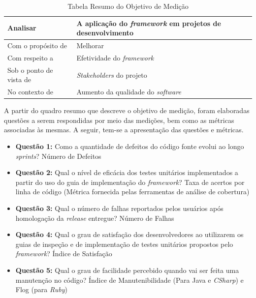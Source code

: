 \begin{table}[h]
\centering
\begin{tabular}{ | m{8cm} | m{8cm} | } 
\hline
Analisar & A aplicação do \textit{framework} em projetos de desenvolvimento \\ 
\hline
Com o propósito de & Melhorar \\ 
\hline
Com respeito a & Efetividade do \textit{framework} \\ 
\hline
Sob o ponto de vista de & \textit{Stakeholders} do projeto \\ 
\hline
No contexto de & Aumento da qualidade do \textit{software} \\ 
\hline
\end{tabular}
\caption{Tabela Resumo do Objetivo de Medição}
\label{table:tabela1}
\end{table}

A partir do quadro resumo que descreve o objetivo de medição, foram elaboradas questões a serem respondidas por meio das medições, bem como as métricas associadas às mesmas. A seguir, tem-se a apresentação das questões e métricas.

\begin{itemize}
	\item \textbf{Questão 1:} Como a quantidade de defeitos do código fonte evolui ao longo \textit{sprints}?
	\subitem Número de Defeitos

	\item \textbf{Questão 2:} Qual o nível de eficácia dos testes unitários implementados a partir do uso do guia de implementação do \textit{framework}?
	\subitem Taxa de acertos por linha de código (Métrica fornecida pelas ferramentas de análise de cobertura)

	\item \textbf{Questão 3:} Qual o número de falhas reportados pelos usuários após homologação da \textit{release} entregue?
	\subitem Número de Falhas

	\item \textbf{Questão 4:} Qual o grau de satisfação dos desenvolvedores ao utilizarem os guias de inspeção e de implementação de testes unitários propostos pelo \textit{framework}?
	\subitem Índice de Satisfação

	\item \textbf{Questão 5:} Qual o grau de facilidade percebido quando vai ser feita uma manutenção no código?
	\subitem Índice de Manutenibilidade (Para Java e \textit{CSharp}) e Flog (para \textit{Ruby})
\end{itemize}

